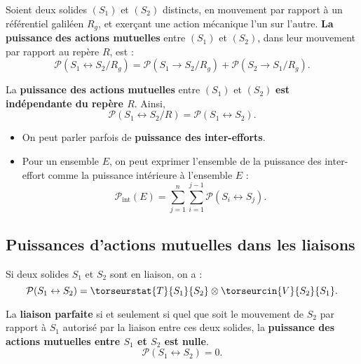 \begin{defi}
Soient deux solides $(S_1)$ et $(S_2)$ distincts, en mouvement par rapport à un référentiel galiléen $R_g$, et exerçant une action mécanique l'un sur l'autre.
\textbf{La puissance} \textbf{des actions mutuelles} entre $(S_1)$ et $(S_2)$, dans leur mouvement par rapport au repère $R$, est :
$$
\mathcal{P}(S_1 \leftrightarrow S_2/R_g)=\mathcal{P}(S_1 \rightarrow S_2/R_g)+\mathcal{P}(S_2 \rightarrow S_1/R_g).
$$		
 
 \end{defi}

\begin{prop}
La \textbf{puissance des actions mutuelles} entre $(S_1)$ et $(S_2)$ \textbf{est indépendante du repère $R$}.
Ainsi,
$$\mathcal{P}(S_1 \leftrightarrow S_2/R)=\mathcal{P}(S_1 \leftrightarrow S_2).
$$
\end{prop}


\begin{rem}%
\begin{itemize}
\item On peut parler parfois de \textbf{puissance des inter-efforts}.
\item Pour un ensemble $E$, on peut exprimer l'ensemble de la puissance des inter-effort comme la puissance intérieure à l'ensemble $E$ : 
$$
\mathcal{P}_{\text{int}}(E)=\displaystyle{\sum^n_{j=1}}\displaystyle{\sum^{j-1}_{i=1}}\mathcal{P}(S_i \leftrightarrow S_j).
$$
\end{itemize}

\end{rem}%


\subsection{Puissances d'actions mutuelles dans les liaisons}
\begin{defi}
Si deux solides $S_1$ et $S_2$ sont en liaison, on a :
$$
\mathcal{P}(S_1 \leftrightarrow S_2) = \torseurstat{T}{S_1}{S_2}\otimes \torseurcin{V}{S_2}{S_1}.
$$

La \textbf{liaison parfaite} si et seulement si quel que soit le mouvement de $S_2$ par rapport à $S_1$ autorisé par la liaison entre ces deux solides, la \textbf{puissance des actions mutuelles entre $S_1$ et $S_2$ est nulle}.
$$
\mathcal{P}(S_1 \leftrightarrow S_2)=0.
$$
\end{defi}


